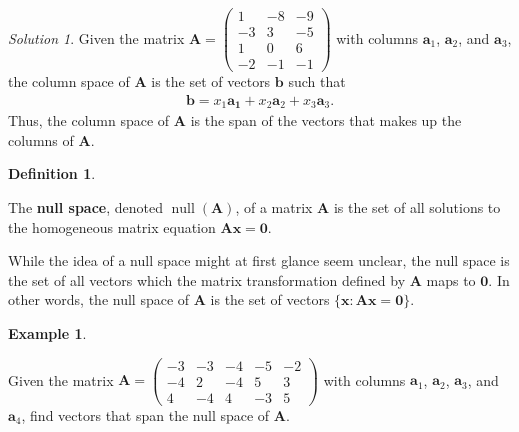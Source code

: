 \documentclass[
]{book}
\theoremstyle{definition}
\newtheorem{definition}{Definition}[chapter]
\theoremstyle{definition}
\newtheorem{example}{Example}[chapter]
\theoremstyle{definition}
\theoremstyle{remark}
\newtheorem*{solution}{Solution}
\begin{document}
\begin{solution}

Given the matrix \(\mathbf{A} = \begin{pmatrix} 1 & -8 & -9 \\ -3 & 3 & -5 \\ 1 & 0 & 6 \\ -2 & -1 & -1 \end{pmatrix}\) with columns \(\mathbf{a}_1\), \(\mathbf{a}_2\), and \(\mathbf{a}_3\), the column space of \(\mathbf{A}\) is the set of vectors \(\mathbf{b}\) such that
\[
\begin{aligned}
\mathbf{b} = x_1 \mathbf{a_1} + x_2 \mathbf{a}_2 + x_3 \mathbf{a}_3.
\end{aligned}
\]
Thus, the column space of \(\mathbf{A}\) is the span of the vectors that makes up the columns of \(\mathbf{A}\).

\end{solution}

\begin{definition}
\protect\hypertarget{def:null-space}{}\label{def:null-space}

The \textbf{null space}, denoted \(\operatorname{null}(\mathbf{A})\), of a matrix \(\mathbf{A}\) is the set of all solutions to the homogeneous matrix equation \(\mathbf{A} \mathbf{x} = \mathbf{0}\).

\end{definition}

While the idea of a null space might at first glance seem unclear, the null space is the set of all vectors which the matrix transformation defined by \(\mathbf{A}\) maps to \(\mathbf{0}\). In other words, the null space of \(\mathbf{A}\) is the set of vectors \(\{ \mathbf{x} : \mathbf{A} \mathbf{x} = \mathbf{0} \}\).

\begin{example}
\protect\hypertarget{exm:unlabeled-div-84}{}\label{exm:unlabeled-div-84}

Given the matrix \(\mathbf{A} = \begin{pmatrix} -3 & -3 & -4 & -5 & -2 \\ -4 & 2 & -4 & 5 & 3 \\ 4 & -4 & 4 & -3 & 5 \end{pmatrix}\) with columns \(\mathbf{a}_1\), \(\mathbf{a}_2\), \(\mathbf{a}_3\), and \(\mathbf{a}_4\), find vectors that span the null space of \(\mathbf{A}\).

\end{example}
\end{document}

